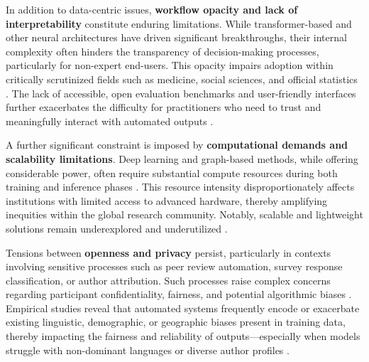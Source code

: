 \documentclass[sigconf]{acmart}
\begin{document}
In addition to data-centric issues, \textbf{workflow opacity and lack of interpretability} constitute enduring limitations. While transformer-based and other neural architectures have driven significant breakthroughs, their internal complexity often hinders the transparency of decision-making processes, particularly for non-expert end-users. This opacity impairs adoption within critically scrutinized fields such as medicine, social sciences, and official statistics \cite{ref61,ref62,ref64,ref70,ref84,ref86,ref88,ref90,ref91,ref92,ref93,ref94,ref95,ref104,ref105,ref108,ref110,ref112,ref114,ref117}. The lack of accessible, open evaluation benchmarks and user-friendly interfaces further exacerbates the difficulty for practitioners who need to trust and meaningfully interact with automated outputs \cite{ref63,ref64,ref68,ref70,ref73,ref78,ref80,ref86,ref87,ref88,ref89,ref90,ref91,ref92,ref93,ref95,ref96,ref97,ref100,ref103,ref104,ref105,ref108,ref109,ref110,ref111,ref112,ref113}.

A further significant constraint is imposed by \textbf{computational demands and scalability limitations}. Deep learning and graph-based methods, while offering considerable power, often require substantial compute resources during both training and inference phases \cite{ref41,ref61,ref62,ref63,ref64,ref68,ref70,ref76,ref78,ref80,ref81,ref82,ref84,ref86,ref87,ref88,ref89,ref90,ref91,ref92,ref93,ref94,ref95,ref99,ref100,ref109,ref110,ref111,ref113,ref114,ref115}. This resource intensity disproportionately affects institutions with limited access to advanced hardware, thereby amplifying inequities within the global research community. Notably, scalable and lightweight solutions remain underexplored and underutilized \cite{ref99,ref102,ref115}.

Tensions between \textbf{openness and privacy} persist, particularly in contexts involving sensitive processes such as peer review automation, survey response classification, or author attribution. Such processes raise complex concerns regarding participant confidentiality, fairness, and potential algorithmic biases \cite{ref73,ref76,ref81,ref85,ref92,ref94,ref97,ref98,ref106,ref110,ref113,ref114,ref115,ref117}. Empirical studies reveal that automated systems frequently encode or exacerbate existing linguistic, demographic, or geographic biases present in training data, thereby impacting the fairness and reliability of outputs—especially when models struggle with non-dominant languages or diverse author profiles \cite{ref61,ref74,ref90,ref92,ref94,ref95,ref104,ref105,ref110,ref112,ref113,ref114,ref115}.
\end{document}
